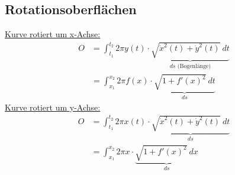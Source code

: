 \subsection{Rotationsoberflächen}
    \underline{Kurve rotiert um x-Achse:}
    \begin{align*}
        O &= \int_{t_1}^{t_2} 2 \pi y(t) \cdot \underbrace{\sqrt{\dot{x}^2(t) + \dot{y}^2(t)}\ dt}_{ds \textrm{ (Bogenlänge)}}\\
          &= \int_{x_1}^{x_2} 2 \pi f(x) \cdot \underbrace{\sqrt{1 + f'(x)^2}\ dt}_{ds}
    \end{align*}
    \underline{Kurve rotiert um y-Achse:}
    \begin{align*}
        O &= \int_{t_1}^{t_2} 2 \pi x(t) \cdot \underbrace{\sqrt{\dot{x}^2(t) + \dot{y}^2(t)}\ dt}_{ds}\\
          &= \int_{x_1}^{x_2} 2 \pi x \cdot \underbrace{\sqrt{1 + f'(x)^2}\ dx}_{ds}
    \end{align*}
